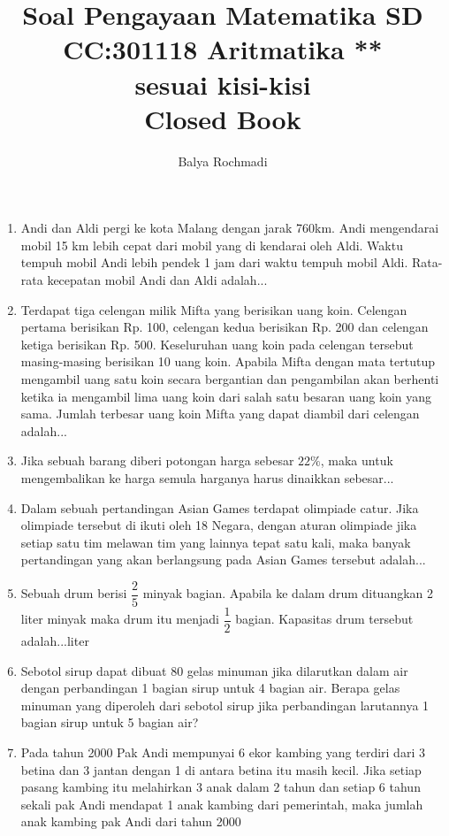 \documentclass[12pt,a4paper,draft,final,oneside,twoside,openright,openany]{article}
\author{Balya Rochmadi}
\title{Soal Pengayaan Matematika SD \\CC:301118 Aritmatika **\\ \small sesuai kisi-kisi  \\
	Closed Book}
\begin{document}
	\maketitle
	\Large
			\noindent\makebox[\linewidth]{\rule{\paperwidth}{0.4pt}}
	\begin{enumerate}
		\item Andi dan Aldi pergi ke kota Malang dengan jarak
		760km. Andi mengendarai mobil 15 km lebih cepat
		dari mobil yang di kendarai oleh Aldi. Waktu
		tempuh mobil Andi lebih pendek 1 jam dari waktu
		tempuh mobil Aldi. Rata-rata kecepatan mobil Andi
		dan Aldi adalah...
		\item Terdapat tiga celengan milik Mifta yang berisikan
		uang koin. Celengan pertama berisikan Rp. 100,
		celengan kedua berisikan Rp. 200 dan celengan
		ketiga berisikan Rp. 500. Keseluruhan uang koin pada
		celengan tersebut masing-masing berisikan 10 uang
		koin. Apabila Mifta dengan mata tertutup mengambil
		uang satu koin secara bergantian dan pengambilan
		akan berhenti ketika ia mengambil lima uang koin
		dari salah satu besaran uang koin yang sama. Jumlah
		terbesar uang koin Mifta yang dapat diambil dari
		celengan adalah...
		\item Jika sebuah barang diberi potongan harga sebesar
		$22\%$, maka untuk mengembalikan ke harga semula
		harganya harus dinaikkan sebesar...
		\item Dalam sebuah pertandingan Asian Games terdapat
		olimpiade catur. Jika olimpiade tersebut di ikuti oleh
		18 Negara, dengan aturan olimpiade jika setiap satu
		tim melawan tim yang lainnya tepat satu kali, maka
		banyak pertandingan yang akan berlangsung pada
		Asian Games tersebut adalah...
		\item Sebuah drum berisi $\dfrac{2}{5}$ minyak bagian. Apabila ke dalam drum dituangkan 2 liter minyak maka drum itu menjadi
		$\dfrac{1}{2}$ bagian. Kapasitas drum tersebut adalah...liter
		\item Sebotol sirup dapat dibuat 80 gelas minuman jika
		dilarutkan dalam air dengan perbandingan 1 bagian
		sirup untuk 4 bagian air. Berapa gelas minuman yang
		diperoleh dari sebotol sirup jika perbandingan
		larutannya 1 bagian sirup untuk 5 bagian air?
		\item Pada tahun 2000 Pak Andi mempunyai 6 ekor
		kambing yang terdiri dari 3 betina dan 3 jantan
		dengan 1 di antara betina itu masih kecil. Jika
		setiap pasang kambing itu melahirkan 3 anak
		dalam 2 tahun dan setiap 6 tahun sekali pak Andi
		mendapat 1 anak kambing dari pemerintah, maka
		jumlah anak kambing pak Andi dari tahun 2000

\end{enumerate}
\end{document}
